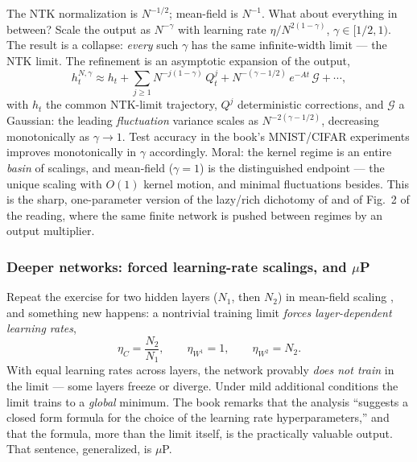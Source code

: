 \documentclass[11pt]{article}
\begin{document}
The NTK normalization is $N^{-1/2}$; mean-field is $N^{-1}$. What about
everything in between? Scale the output as $N^{-\gamma}$ with learning rate
$\eta/N^{2(1-\gamma)}$, $\gamma \in [1/2, 1)$. The result
\cite[\S20.6]{spiliopoulos2025foundations} is a collapse: \emph{every} such
$\gamma$ has the same infinite-width limit --- the NTK limit. The refinement
is an asymptotic expansion of the output,
\begin{equation}
  h_t^{N,\gamma} \approx h_t + \sum_{j\ge1} N^{-j(1-\gamma)}\, Q_t^{j}
  + N^{-(\gamma - 1/2)}\, e^{-At}\,\mathcal{G} + \cdots,
\end{equation}
with $h_t$ the common NTK-limit trajectory, $Q^j$ deterministic
corrections, and $\mathcal{G}$ a Gaussian: the leading \emph{fluctuation}
variance scales as $N^{-2(\gamma - 1/2)}$, decreasing monotonically as
$\gamma \to 1$. Test accuracy in the book's MNIST/CIFAR experiments improves
monotonically in $\gamma$ accordingly. Moral: the kernel regime is an entire
\emph{basin} of scalings, and mean-field ($\gamma = 1$) is the distinguished
endpoint --- the unique scaling with $O(1)$ kernel motion, and minimal
fluctuations besides. This is the sharp, one-parameter version of the
lazy/rich dichotomy of \cite{chizat2019lazy} and of Fig.~2 of the reading,
where the same finite network is pushed between regimes by an output
multiplier.

\subsubsection{Deeper networks: forced learning-rate scalings, and $\mu$P}
\label{sec:mup-deep}

Repeat the exercise for two hidden layers ($N_1$, then $N_2$) in mean-field
scaling \cite[\S20.5]{spiliopoulos2025foundations}, and something new
happens: a nontrivial training limit \emph{forces layer-dependent learning
rates},
\begin{equation}
  \eta_C = \frac{N_2}{N_1}, \qquad \eta_{W^1} = 1, \qquad \eta_{W^2} = N_2 .
\end{equation}
With equal learning rates across layers, the network provably \emph{does not
train} in the limit --- some layers freeze or diverge. Under mild additional
conditions the limit trains to a \emph{global} minimum. The book remarks
that the analysis ``suggests a closed form formula for the choice of the
learning rate hyperparameters,'' and that the formula, more than the limit
itself, is the practically valuable output. That sentence, generalized, is
$\mu$P.
\end{document}
